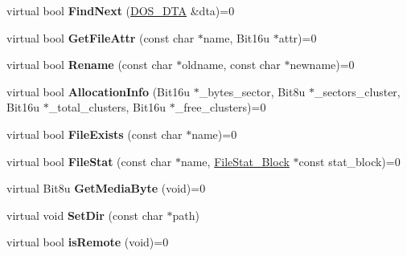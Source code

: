 \begin{DoxyCompactItemize}
\item 
\hypertarget{classDOS__Drive_aa2feef7be81869b683b6945159df5149}{virtual bool {\bfseries Find\-Next} (\hyperlink{classDOS__DTA}{D\-O\-S\-\_\-\-D\-T\-A} \&dta)=0}\label{classDOS__Drive_aa2feef7be81869b683b6945159df5149}

\item 
\hypertarget{classDOS__Drive_aff8f34bd9601bceeeb587fd0e4cd51bf}{virtual bool {\bfseries Get\-File\-Attr} (const char $\ast$name, Bit16u $\ast$attr)=0}\label{classDOS__Drive_aff8f34bd9601bceeeb587fd0e4cd51bf}

\item 
\hypertarget{classDOS__Drive_a1329723ca172ad17e932caeb052469e8}{virtual bool {\bfseries Rename} (const char $\ast$oldname, const char $\ast$newname)=0}\label{classDOS__Drive_a1329723ca172ad17e932caeb052469e8}

\item 
\hypertarget{classDOS__Drive_a5e15b725bcef2e78fd17fad8981b560d}{virtual bool {\bfseries Allocation\-Info} (Bit16u $\ast$\-\_\-bytes\-\_\-sector, Bit8u $\ast$\-\_\-sectors\-\_\-cluster, Bit16u $\ast$\-\_\-total\-\_\-clusters, Bit16u $\ast$\-\_\-free\-\_\-clusters)=0}\label{classDOS__Drive_a5e15b725bcef2e78fd17fad8981b560d}

\item 
\hypertarget{classDOS__Drive_ac40baf5634ab1e58e38d0dda0dff3afb}{virtual bool {\bfseries File\-Exists} (const char $\ast$name)=0}\label{classDOS__Drive_ac40baf5634ab1e58e38d0dda0dff3afb}

\item 
\hypertarget{classDOS__Drive_a9e38d58283c5e54845e81751e36b646e}{virtual bool {\bfseries File\-Stat} (const char $\ast$name, \hyperlink{structFileStat__Block}{File\-Stat\-\_\-\-Block} $\ast$const stat\-\_\-block)=0}\label{classDOS__Drive_a9e38d58283c5e54845e81751e36b646e}

\item 
\hypertarget{classDOS__Drive_a344fbf135d82e7330c309c9b7dfad7e8}{virtual Bit8u {\bfseries Get\-Media\-Byte} (void)=0}\label{classDOS__Drive_a344fbf135d82e7330c309c9b7dfad7e8}

\item 
\hypertarget{classDOS__Drive_a60dbe76d92bff85e197fc51cc433f0e3}{virtual void {\bfseries Set\-Dir} (const char $\ast$path)}\label{classDOS__Drive_a60dbe76d92bff85e197fc51cc433f0e3}

\item 
\hypertarget{classDOS__Drive_afe789aa0e61388914c4ab1d73ff591d9}{virtual bool {\bfseries is\-Remote} (void)=0}\label{classDOS__Drive_afe789aa0e61388914c4ab1d73ff591d9}


\end{DoxyCompactItemize}
